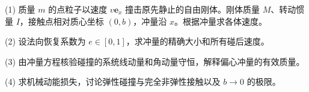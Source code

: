 (1) 质量 \(m\) 的点粒子以速度 \(v\mathbf e_x\) 撞击原先静止的自由刚体。刚体质量 \(M\)、转动惯量 \(I\)，接触点相对质心坐标 \((0,b)\)，冲量沿 \(x\)。根据冲量求各体速度。

(2) 设法向恢复系数为 \(e\in[0,1]\)，求冲量的精确大小和所有碰后速度。

(3) 由冲量方程核验碰撞的系统线动量和角动量守恒，解释偏心冲量的有效质量。

(4) 求机械动能损失，讨论弹性碰撞与完全非弹性接触以及 \(b\to0\) 的极限。
